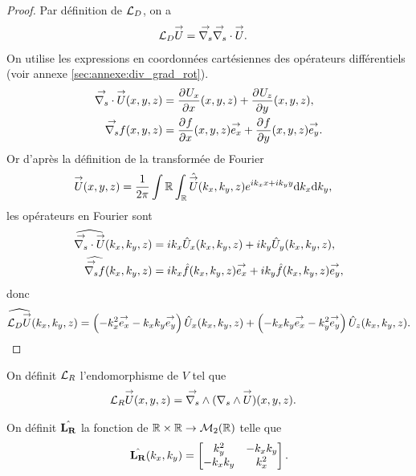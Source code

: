     \begin{proof}
      Par définition de \(\LD\), on a
      \begin{align*}
        \LD \vect{U} & = \vgrads{} \vdivs{} \vect{U}.
      \end{align*}
      On utilise les expressions en coordonnées cartésiennes des opérateurs différentiels (voir annexe \ref{sec:annexe:div_grad_rot}).
      \begin{align*}
        \vdivs{\vect{U}}(x,y,z) &= \ddr{x}{U_x}(x,y,z) + \ddr{y}{U_z}(x,y,z),
        \\
        \vgrads{f}(x,y,z) &= \ddr{x}{f}(x,y,z)\vect{e_x} + \ddr{y}{f}(x,y,z)\vect{e_y}.
      \end{align*}
      Or d’après la définition de la transformée de Fourier
      \begin{align*}
        \vect{U}(x,y,z) & = \frac{1}{2\pi} \int\RR \int_\RR \hat{\vect{U}}(k_x,k_y,z)e^{ik_xx + ik_yy}\dd{k_x}\dd{k_y},
      \end{align*}
      les opérateurs en Fourier sont
      \begin{align*}
        \widehat{\vdivs{\vect{U}}}(k_x,k_y,z) &= ik_x{\hat{U}_x}(k_x,k_y,z) + ik_y{\hat{U}_y}(k_x,k_y,z),
        \\
        \widehat{\vgrads{f}}(k_x,k_y,z) &= ik_x\hat{f}(k_x,k_y,z)\vect{e_x} + ik_y\hat{f}(k_x,k_y,z)\vect{e_y},
      \end{align*}
      donc
      \begin{align*}
        \widehat{\LD{\vect{U}}}(k_x,k_y,z) =  \left(-k_x^2\vect{e_x} -k_xk_y\vect{e_y}\right){\hat{U}_x}(k_x,k_y,z) + \left(-k_xk_y\vect{e_x} - {k_y^2}\vect{e_y}\right){\hat{U}_z}(k_x,k_y,z).
      \end{align*}

    \end{proof}


    \begin{defn}
      \label{eq:plan:fourier:LR}

      On définit \(\LR\) l'endomorphisme de \(V\) tel que
      \begin{align*}
        \LR \vect{U}(x,y,z) & = \vrots{} (\rots{} \vect{U})(x,y,z).
      \end{align*}

      On définit \(\hat{\mLR}\) la fonction de \(\RR\times\RR \rightarrow \mathcal{M}_2(\RR)\) telle que
      \begin{equation*}
        \hat{\mLR}(k_x,k_y) = 
        \begin{bmatrix}
          k_y^2 & -k_xk_y
          \\
          -k_xk_y & k_x^2
        \end{bmatrix}.
      \end{equation*}
    \end{defn}

